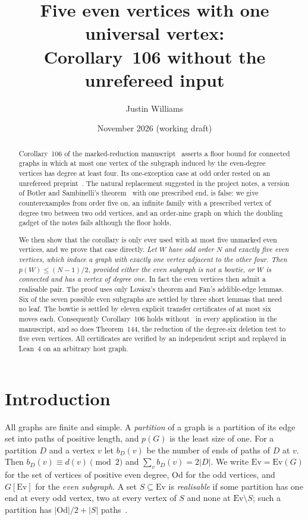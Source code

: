 \documentclass[11pt]{amsart}
\title[Five even vertices with one universal vertex]{Five even vertices with one universal vertex:\\ Corollary~106 without the unrefereed input}
\author{Justin Williams}
\date{November 2026 (working draft)}
\theoremstyle{definition}
\newcommand{\Ev}{\mathrm{Ev}}
\newcommand{\Od}{\mathrm{Od}}
\begin{document}
\begin{abstract}
Corollary~106 of the marked-reduction manuscript~\cite{MR} asserts a floor bound for connected
graphs in which at most one vertex of the subgraph induced by the even-degree vertices has degree at
least four. Its one-exception case at odd order rested on an unrefereed preprint~\cite{Shaik}. The
natural replacement suggested in the project notes, a version of Botler and Sambinelli's
theorem~\cite[Theorem~13]{BS} with one prescribed end, is false: we give counterexamples from
order five on, an infinite family with a prescribed vertex of degree two between two odd vertices,
and an order-nine graph on which the doubling gadget of the notes fails although the floor holds.

We then show that the corollary is only ever used with at most five unmarked even vertices, and we
prove that case directly. \emph{Let $W$ have odd order $N$ and exactly five even vertices, which
induce a graph with exactly one vertex adjacent to the other four. Then $p(W)\le(N-1)/2$, provided
either the even subgraph is not a bowtie, or $W$ is connected and has a vertex of degree one.} In
fact the even vertices then admit a realisable pair. The proof uses only Lov\'asz's theorem and
Fan's addible-edge lemmas. Six of the seven possible even subgraphs are settled by three short
lemmas that need no leaf. The bowtie is settled by eleven explicit transfer certificates of at most
six moves each. Consequently Corollary~106 holds without~\cite{Shaik} in every application in the
manuscript, and so does Theorem~144, the reduction of the degree-six deletion test to five even
vertices. All certificates are verified by an independent script and replayed in Lean~4 on an
arbitrary host graph.
\end{abstract}
\maketitle

\section{Introduction}

All graphs are finite and simple. A \emph{partition} of a graph is a partition of its edge set into
paths of positive length, and $p(G)$ is the least size of one. For a partition $D$ and a vertex $v$
let $b_D(v)$ be the number of ends of paths of $D$ at $v$. Then $b_D(v)\equiv d(v)\pmod 2$ and
$\sum_v b_D(v)=2|D|$. We write $\Ev=\Ev(G)$ for the set of vertices of positive even degree,
$\Od$ for the odd vertices, and $G[\Ev]$ for the \emph{even subgraph}. A set $S\subseteq\Ev$ is
\emph{realisable} if some partition has one end at every odd vertex, two at every vertex of $S$ and
none at $\Ev\setminus S$; such a partition has $|\Od|/2+|S|$ paths~\cite{ES}.
\end{document}
